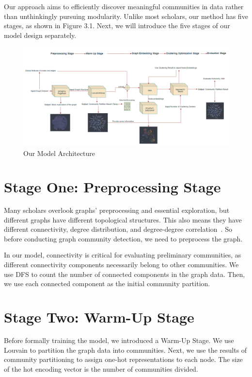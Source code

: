 \documentclass[ %
                    author={Tengyao Tu},
                supervisor={Dr. James Pope},
                    degree={MSc},
                     title={A New Perspective on Graph Community Detection: Combining Traditional Methods with Deep Learning Approaches},
                  subtitle={Applying to Telecom Networks and Diverse Datasets},
                      type={},
                      year={2024}]{dissertation}
\begin{document}
Our approach aims to efficiently discover meaningful communities in data rather than unthinkingly pursuing modularity. Unlike most scholars, our method has five stages, as shown in Figure 3.1. Next, we will introduce the five stages of our model design separately.
\begin{figure}[h!] %
    \centering
    \includegraphics[width=1.0\textwidth]{Figure_3.png} %
    \caption{Our Model Architecture}
    \label{fig: Our Model Architecture}
\end{figure}
\section{Stage One: Preprocessing Stage}
Many scholars overlook graphs' preprocessing and essential exploration, but different graphs have different topological structures. This also means they have different connectivity, degree distribution, and degree-degree correlation~\cite{borner2007network}. So before conducting graph community detection, we need to preprocess the graph.

In our model, connectivity is critical for evaluating preliminary communities, as different connectivity components necessarily belong to other communities. We use DFS to count the number of connected components in the graph data. Then, we use each connected component as the initial community partition.
\section{Stage Two: Warm-Up Stage}
Before formally training the model, we introduced a Warm-Up Stage. We use Louvain to partition the graph data into communities. Next, we use the results of community partitioning to assign one-hot representations to each node. The size of the hot encoding vector is the number of communities divided.
\end{document}
